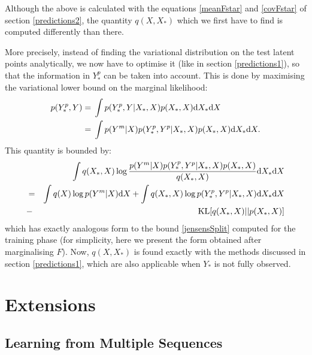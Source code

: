 \documentclass [10pt , a4paper]{article}
\begin{document}
Although the above is calculated with the equations \eqref{meanFstar} and \eqref{covFstar} of section \ref{predictions2},
the quantity $q(X,X_*)$ which we first have to find is computed differently than there.

More precisely, instead of finding the variational distribution on the test latent points analytically, we now have to
optimise it (like in section \ref{predictions1}), so that the information in $Y_*^p$ can be taken into account.
This is done by maximising the variational lower bound on the marginal likelihood:
\begin{align}
p(Y_*^p, Y) ={}&  \int p(Y_*^p, Y|X_*, X) p(X_*, X) \text{d}  X_* \text{d}  X \nonumber \\
={}&  \int p(Y^m | X) p(Y_*^p, Y^p|X_*, X) p(X_*, X) \text{d}  X_* \text{d}  X.  \nonumber
\end{align}
This quantity is bounded by:
\begin{eqnarray}
& & \int q(X_*, X) \log \frac{ p(Y^m | X) 
p(Y_*^p, Y^p|X_*, X) p(X_*,X)}{ q(X_*, X)} \text{d}  X_* \text{d}  X \nonumber \\ 
& = & \int q(X) \log p(Y^m | X) \text{d}  X 
+  \int q(X_*,X) \log p(Y_*^p, Y^p|X_*, X) \text{d}  X_* \text{d}  X  \nonumber \\
& - & \text{KL}[q(X_*,X) || p(X_*, X)] \label{partialPredLowerBound}
\end{eqnarray}  
which has exactly analogous form to the bound \eqref{jensensSplit} computed for the training phase
(for simplicity, here we present the form obtained after marginalising $F$). Now, $q(X,X_*)$ is
found exactly with the methods discussed in section \ref{predictions1}, which are also applicable
when $Y_*$ is not fully observed. 






\section{\label{section:extensions} Extensions}
\subsection{Learning from Multiple Sequences \label{sequences}}
\end{document}
